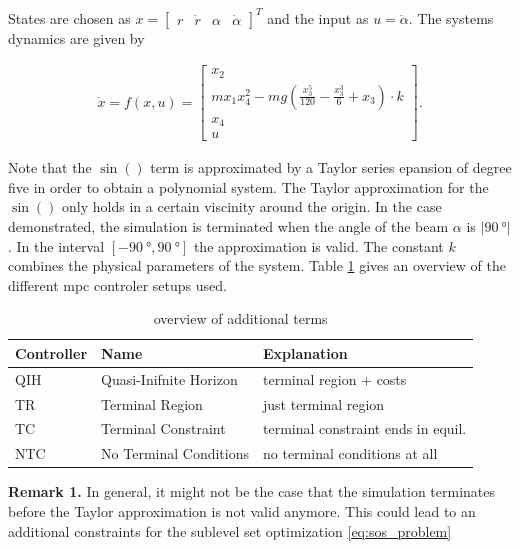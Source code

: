 \documentclass[10pt,a4paper,titlepage]{article}
\begin{document}
States are chosen as $x = \begin{bmatrix} r & \dot{r} & \alpha & \dot{\alpha} \end{bmatrix}^T$ and the input as $u = \ddot{\alpha}$. The systems dynamics are given by

\begin{align}
    \dot{x} = f(x,u) = \begin{bmatrix}
        x_2 \\
        m x_1 x_4^2 - m g \left(\frac{x_3^5}{120} - \frac{x_3^3}{6} + x_3\right) \cdot k \\
        x_4 \\
        u
    \end{bmatrix}.
\end{align}

Note that the $\sin()$ term is approximated by a Taylor series epansion of degree five in order to obtain a polynomial system.
The Taylor approximation for the $\sin()$ only holds in a certain viscinity around the origin. In the case demonstrated, the simulation is terminated when
the angle of the beam $\alpha$ is $|\SI{90}{\degree}|$. In the interval $[-\SI{90}{\degree}, \SI{90}{\degree}]$ the approximation is valid.
The constant $k$ combines the physical parameters of the system. Table \ref{tbl:controler} gives an overview of the different \gls{mpc} controler setups used.

\renewcommand{\arraystretch}{1.25}
\begin{table}[ht]
    \centering
    \captionsetup{skip=0.25cm}
    \caption{overview of additional terms}
    \label{tbl:controler}
    \begin{tabular}{|p{2cm}|p{3.75cm}|p{5.75cm}|}
        \hline
        \textbf{Controller} & \textbf{Name} &  \textbf{Explanation}\\
        \hline
        QIH & Quasi-Inifnite Horizon & terminal region + costs\\
        \hline
        TR & Terminal Region & just terminal region\\
        \hline
        TC & Terminal Constraint & terminal constraint ends in equil.\\
        \hline
        NTC & No Terminal Conditions & no terminal conditions at all\\
        \hline
    \end{tabular}
\end{table}

\textbf{Remark 1.} In general, it might not be the case that the simulation terminates before the Taylor approximation is not valid anymore.
This could lead to an additional constraints for the sublevel set optimization \eqref{eq:sos_problem}
\end{document}
